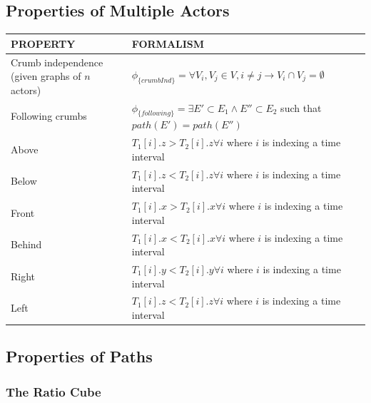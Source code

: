\subsection{Properties of Multiple Actors}
\begin{tabular}{| p{2.8cm} | p{11.5cm} | }
\hline
PROPERTY & FORMALISM \\ \hline
 Crumb independence (given graphs of $n$ actors)& $\phi_{\{crumbInd\}} =  \forall V_i,V_j \in V, i \neq j \rightarrow V_i \cap V_j = \emptyset $ \\ \hline
 Following crumbs & $\phi_{\{following\}} =  \exists E' \subset E_1 \land E'' \subset E_2$ such that $path(E')=path(E'') $  \\ \hline
 Above & $T_1[i].z > T_2[i].z \forall i$ where $i$ is indexing a time interval\\ \hline
 Below & $T_1[i].z < T_2[i].z \forall i$ where $i$ is indexing a time interval\\ \hline
 Front & $T_1[i].x > T_2[i].x \forall i$ where $i$ is indexing a time interval\\ \hline
 Behind & $T_1[i].x < T_2[i].x \forall i$ where $i$ is indexing a time interval\\ \hline
 Right & $T_1[i].y < T_2[i].y \forall i$ where $i$ is indexing a time interval \\ \hline
 Left & $T_1[i].z < T_2[i].z \forall i$ where $i$ is indexing a time interval \\ \hline
\end{tabular}


\subsection{Properties of Paths}
\subsubsection{The Ratio Cube}

